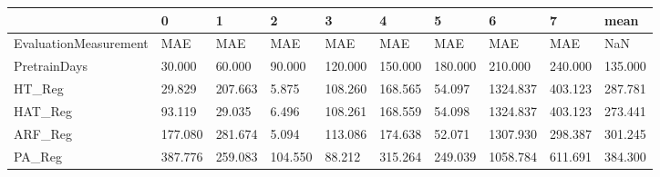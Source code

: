 \begin{tabular}{llllllllll}
\toprule
{} &       0 &       1 &       2 &       3 &       4 &       5 &        6 &       7 &    mean \\
\midrule
EvaluationMeasurement &     MAE &     MAE &     MAE &     MAE &     MAE &     MAE &      MAE &     MAE &     NaN \\
PretrainDays          &  30.000 &  60.000 &  90.000 & 120.000 & 150.000 & 180.000 &  210.000 & 240.000 & 135.000 \\
HT\_Reg                &  29.829 & 207.663 &   5.875 & 108.260 & 168.565 &  54.097 & 1324.837 & 403.123 & 287.781 \\
HAT\_Reg               &  93.119 &  29.035 &   6.496 & 108.261 & 168.559 &  54.098 & 1324.837 & 403.123 & 273.441 \\
ARF\_Reg               & 177.080 & 281.674 &   5.094 & 113.086 & 174.638 &  52.071 & 1307.930 & 298.387 & 301.245 \\
PA\_Reg                & 387.776 & 259.083 & 104.550 &  88.212 & 315.264 & 249.039 & 1058.784 & 611.691 & 384.300 \\
\bottomrule
\end{tabular}

